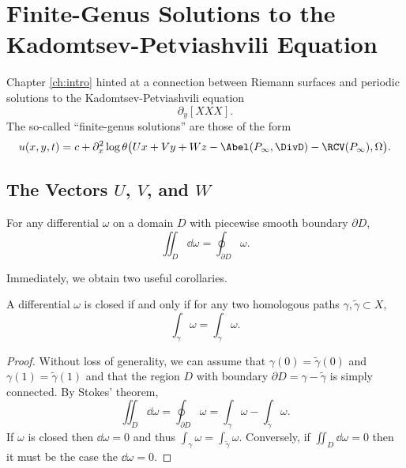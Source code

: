 \chapter{Finite-Genus Solutions to the Kadomtsev-Petviashvili Equation}

Chapter \ref{ch:intro} hinted at a connection between Riemann surfaces and
periodic solutions to the Kadomtsev-Petviashvili equation
\begin{equation} \label{eqn:kp}
  \partial_y [XXX].
\end{equation}
The so-called ``finite-genus solutions'' are those of the form
\begin{equation} \label{eqn:finite-genus}
  u(x,y,t) = c + \partial_x^2 \log
  \theta\big(
  Ux + Vy + Wz - \Abel(P_\infty,\DivD) - \RCV(P_\infty), \Omega
  \big).
\end{equation}




\section{The Vectors $U$, $V$, and $W$}





\begin{theorem} \label{thm:stokes}
  For any differential $\omega$ on a domain $D$ with piecewise smooth boundary
  $\partial D$,
  \begin{equation}
    \iint_D \dd \omega = \oint_{\partial D} \omega.
  \end{equation}
\end{theorem}
Immediately, we obtain two useful corollaries.
\begin{corollary} \label{cor:differential-hom-paths}
  A differential $\omega$ is closed if and only if for any two homologous paths
  $\gamma, \tilde{\gamma} \subset X$,
  \[
  \int_\gamma \omega = \int_{\tilde{\gamma}} \omega.
  \]
\end{corollary}
\begin{proof}
  Without loss of generality, we can assume that $\gamma(0) =
  \tilde{\gamma}(0)$ and $\gamma(1) = \tilde{\gamma}(1)$ and that the region
  $D$ with boundary $\partial D = \gamma - \tilde{\gamma}$ is simply
  connected. By Stokes' theorem,
  \[
  \iint_D \dd \omega
  =
  \oint_{\partial D} \omega
  =
  \int_\gamma \omega - \int_{\tilde{\gamma}} \omega.
  \]
  If $\omega$ is closed then $\dd \omega = 0$ and thus $\int_\gamma \omega =
  \int_{\tilde{\gamma}} \omega$. Conversely, if $\iint_D \dd \omega = 0$ then
    it must be the case the $\dd \omega = 0$.
\end{proof}

